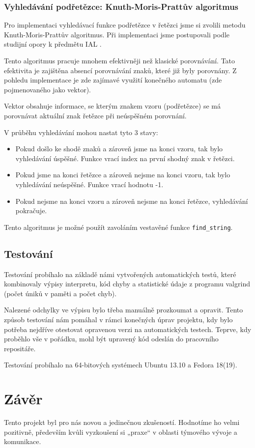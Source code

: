 \documentclass[12pt,a4paper]{article}
\begin{document}
\subsubsection{Vyhledávání podřetězce: Knuth-Moris-Prattův algoritmus}
Pro implementaci vyhledávací funkce podřetězce v řetězci jsme si zvolili metodu Knuth-Moris-Prattův algoritmus. Při implementaci jsme postupovali podle studijní opory k předmětu IAL \cite{ial_skripta}.

Tento algoritmus pracuje mnohem efektivněji než klasické porovnávání. Tato efektivita je zajištěna absencí porovnávání znaků, které již byly porovnány. Z pohledu implementace je zde zajímavé využití konečného automatu (zde pojmenovaného jako vektor). 
 
Vektor obsahuje informace, se kterým znakem vzoru (podřetězce) se má porovnávat aktuální znak řetězce při neúspěšném porovnání. 

V průběhu vyhledávání mohou nastat tyto 3 stavy:
\begin{itemize}
\item Pokud došlo ke shodě znaků a zároveň jsme na konci vzoru, tak bylo vyhledávání úspěšné. Funkce vrací index na první shodný znak v řetězci.
\item Pokud jsme na konci řetězce a zároveň nejsme na konci vzoru, tak bylo vyhledávání neúspěšné. Funkce vrací hodnotu -1.
\item Pokud nejsme na konci vzoru a zároveň nejsme na konci řetězce, vyhledávání pokračuje.
\end{itemize}
Tento algoritmus je možné použít zavoláním vestavěné funkce \verb|find_string|.

\subsection{Testování}
Testování probíhalo na základě námi vytvořených automatických testů, které kombinovaly výpisy interpretu, kód chyby a statistické údaje z programu valgrind (počet úniků v paměti a počet chyb).

Nalezené odchylky ve výpisu bylo třeba manuálně prozkoumat a opravit. Tento způsob testování nám pomáhal v rámci konečných úprav projektu, kdy bylo potřeba nejdříve otestovat opravenou verzi na automatických testech. Teprve, kdy proběhlo vše v pořádku, mohl být upravený kód odeslán do pracovního repositáře.

Testování probíhalo na 64-bitových systémech Ubuntu 13.10 a Fedora 18(19).  
 
\newpage
\section{Závěr}
Tento projekt byl pro nás novou a jedinečnou zkušeností. Hodnotíme ho velmi pozitivně, především kvůli vyzkoušení si „praxe“ v oblasti týmového vývoje a komunikace.  
\end{document}
